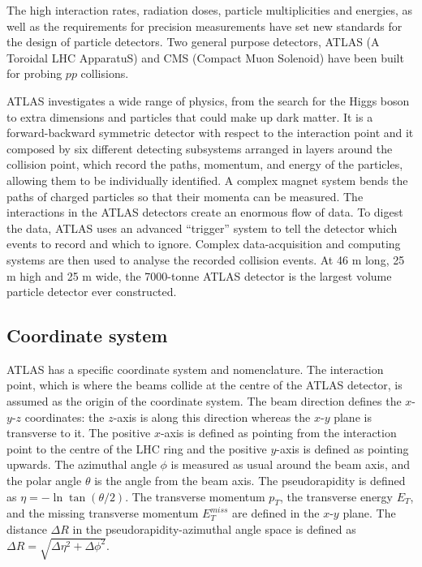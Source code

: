 \documentclass[a4paper, oneside, 11pt, openright]{book}
\begin{document}
			The high interaction rates, radiation doses, particle multiplicities and energies, as well as the requirements for precision measurements have set new standards for the design of particle detectors. Two general purpose detectors, ATLAS (A Toroidal LHC ApparatuS) and CMS (Compact Muon Solenoid) have been built for probing $pp$ collisions.
	
			ATLAS \cite{ATLAS_DESIGN_2008} investigates a wide range of physics, from the search for the Higgs boson to extra dimensions and particles that could make up dark matter. It is a forward-backward symmetric detector with respect to the interaction point and it composed by six different detecting subsystems arranged in layers around the collision point, which record the paths, momentum, and energy of the particles, allowing them to be individually identified. A complex magnet system bends the paths of charged particles so that their momenta can be measured. The interactions in the ATLAS detectors create an enormous flow of data. To digest the data, ATLAS uses an advanced “trigger” system to tell the detector which events to record and which to ignore. Complex data-acquisition and computing systems are then used to analyse the recorded collision events. At 46 m long, 25 m high and 25 m wide, the 7000-tonne ATLAS detector is the largest volume particle detector ever constructed.
			
			\subsection{Coordinate system}
				ATLAS has a specific coordinate system and nomenclature. The interaction point, which is where the beams collide at the centre of the ATLAS detector, is assumed as the origin of the coordinate system. The beam direction defines the $x$-$y$-$z$ coordinates: the $z$-axis is along this direction whereas the $x$-$y$ plane is transverse to it. The positive $x$-axis is defined as pointing from the interaction point to the centre of the LHC ring and the positive $y$-axis is defined as pointing upwards. The azimuthal angle $\phi$ is measured as usual around the beam axis, and the polar angle $\theta$ is the angle from the beam axis. The pseudorapidity is defined as $\eta = - \ln \tan(\theta/2)$. The transverse momentum $p_T$, the transverse energy $E_T$, and the missing transverse momentum $E_T^{miss}$ are defined in the $x$-$y$ plane. The distance $\Delta R$ in the pseudorapidity-azimuthal angle space is defined as $\Delta R = \sqrt{\Delta\eta^2 + \Delta\phi^2}$.
				
\end{document}
